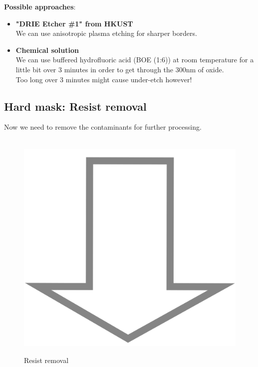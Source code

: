 \textbf{Possible approaches}:
\begin{itemize}
	\item \textbf{"DRIE Etcher \#1" from HKUST} \\
	We can use anisotropic plasma etching for sharper borders.
	\item \textbf{Chemical solution} \\
	We can use buffered hydrofluoric acid (BOE (1:6)) at room temperature for a little bit over 3 minutes in order to get through the 300nm of oxide.\\
	Too long over 3 minutes might cause under-etch however!
\end{itemize}

\subsection{Hard mask: Resist removal}
Now we need to remove the contaminants for further processing.

\begin{figure}[H]
	\centering
	\begin{tikzpicture}[node distance = 3cm, auto, thick,scale=\CrossSectionOnly, every node/.style={transform shape}]
		
	\end{tikzpicture} \\
	\includegraphics[scale=0.01]{down_arrow.png} \\
	\begin{tikzpicture}[node distance = 3cm, auto, thick,scale=\CrossSectionOnly, every node/.style={transform shape}]
		
	\end{tikzpicture}
	\caption{Resist removal}
\end{figure}

